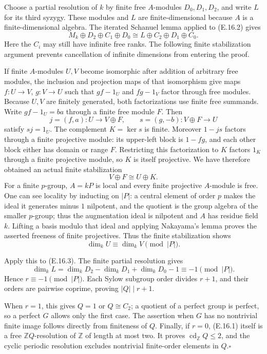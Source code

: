 Choose a partial resolution of $k$ by finite free $A$-modules
$D_0,D_1,D_2$, and write $L$ for its third syzygy. These
modules and $L$ are finite-dimensional because $A$ is a
finite-dimensional algebra. The iterated Schanuel lemma
applied to (E.16.2) gives
\[
 M_k\oplus D_2\oplus C_1\oplus D_0
 \cong L\oplus C_2\oplus D_1\oplus C_0.
 \tag{E.16.3}
\]
Here the $C_i$ may still have infinite free ranks. The following
finite stabilization argument prevents cancellation of infinite
dimensions from entering the proof.

If finite $A$-modules $U,V$ become isomorphic after addition
of arbitrary free modules, the inclusion and projection maps
of that isomorphism give maps $f:U\to V$, $g:V\to U$ such
that $gf-1_U$ and $fg-1_V$ factor through free modules.
Because $U,V$ are finitely generated, both factorizations
use finite free summands. Write $gf-1_U=ba$ through a finite
free module $F$. Then
\[
 j=(f,a):U\longrightarrow V\oplus F,
 \qquad s=(g,-b):V\oplus F\longrightarrow U
\]
satisfy $sj=1_U$. The complement $K=\ker s$ is finite.
Moreover $1-js$ factors through a finite projective module:
its upper-left block is $1-fg$, and each other block either
has domain or range $F$. Restricting this factorization to
$K$ factors $1_K$ through a finite projective module, so
$K$ is itself projective. We have therefore obtained an
actual finite stabilization
\[
                         V\oplus F\cong U\oplus K.
\]
For a finite $p$-group, $A=kP$ is local and every finite
projective $A$-module is free. One can see locality by
inducting on $|P|$: a central element of order $p$ makes
the ideal it generates minus $1$ nilpotent, and the quotient
is the group algebra of the smaller $p$-group; thus the
augmentation ideal is nilpotent and $A$ has residue field $k$.
Lifting a basis modulo that ideal and applying Nakayama's
lemma proves the asserted freeness of finite projectives.
Thus the finite stabilization shows
\[
                         \dim_k U\equiv\dim_k V\pmod{|P|}.
\]

Apply this to (E.16.3). The finite partial resolution gives
\[
 \dim_k L=\dim_k D_2-\dim_k D_1+\dim_k D_0-1
          \equiv-1\pmod{|P|}.
\]
Hence $r\equiv-1\pmod{|P|}$. Each Sylow subgroup order
divides $r+1$, and their orders are pairwise coprime, proving
$|Q|\mid r+1$.

When $r=1$, this gives $Q=1$ or $Q\cong C_2$; a quotient
of a perfect group is perfect, so a perfect $G$ allows only
the first case. The assertion when $G$ has no nontrivial
finite image follows directly from finiteness of $Q$.
Finally, if $r=0$, (E.16.1) itself is a free
$\mathbb ZQ$-resolution of $\mathbb Z$ of length at most two.
It proves $\operatorname{cd}_{\mathbb Z}Q\leq2$, and the
cyclic periodic resolution excludes nontrivial finite-order
elements in $Q$.\hfill$\square$

